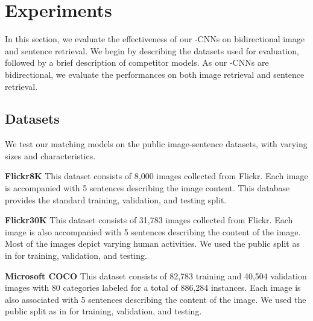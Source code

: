 \documentclass[10pt,twocolumn,letterpaper]{article}
\begin{document}
\section{Experiments}
\label{sec_experiment}


In this section, we evaluate the effectiveness of our -CNNs on bidirectional image and sentence retrieval. We begin by describing the datasets used for evaluation, followed by a brief description of competitor models. As our -CNNs are bidirectional, we evaluate the performances on both  image retrieval and sentence retrieval.



\subsection{Datasets}

\label{sec_setting:database}
We test our matching models on the public image-sentence datasets, with varying sizes and characteristics.

\vspace{4pt}
\noindent \textbf{Flickr8K} \cite{hodosh_jair2013}  This dataset consists of 8,000 images collected from Flickr. Each image is accompanied with 5 sentences describing the image content. This database provides the standard training, validation, and testing split.

\vspace{4pt}
\noindent \textbf{Flickr30K} \cite{young_tacl2014} This dataset  consists of 31,783 images collected from Flickr. Each image is also accompanied with 5 sentences describing the content of the image. Most of the images depict varying human activities. We used the public split as in \cite{mao_2014} for training, validation, and testing.

\vspace{4pt}
\noindent \textbf{Microsoft COCO} \cite{lin_arxiv2014} This dataset consists of 82,783 training and 40,504 validation images with 80 categories labeled for a total of 886,284 instances. Each image is also associated with 5 sentences describing the content of the image. We used the public split as in \cite{mao_iclr_2015} for training, validation, and testing.
\end{document}
